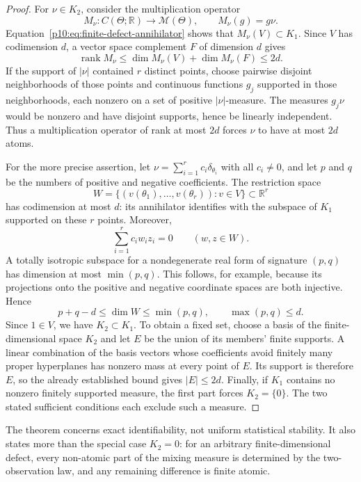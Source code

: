 \documentclass[11pt,letterpaper]{article}
\theoremstyle{definition}
\theoremstyle{remark}
\newcommand{\1}{\mathbf 1}
\begin{document}
\begin{proof}
For $\nu\in K_2$, consider the multiplication operator
\[
 M_\nu:C(\Theta;\mathbb R)\longrightarrow\mathcal M(\Theta),
 \qquad M_\nu(g)=g\nu.
\]
Equation~\eqref{p10:eq:finite-defect-annihilator} shows that
$M_\nu(V)\subset K_1$.  Since $V$ has codimension $d$, a vector space
complement $F$ of dimension $d$ gives
\[
 \operatorname{rank}M_\nu
 \leq \dim M_\nu(V)+\dim M_\nu(F)\leq 2d.
\]
If the support of $|\nu|$ contained $r$ distinct points, choose pairwise
disjoint neighborhoods of those points and continuous functions $g_j$
supported in those neighborhoods, each nonzero on a set of positive
$|\nu|$-measure.  The measures $g_j\nu$ would be nonzero and have disjoint
supports, hence be linearly independent.  Thus a multiplication operator of
rank at most $2d$ forces $\nu$ to have at most $2d$ atoms.

For the more precise assertion, let
$\nu=\sum_{i=1}^r c_i\delta_{\theta_i}$ with all $c_i\neq0$, and let $p$
and $q$ be the numbers of positive and negative coefficients.  The restriction
space
\[
 W=\{(v(\theta_1),\ldots,v(\theta_r)):v\in V\}\subset\mathbb R^r
\]
has codimension at most $d$: its annihilator identifies with the subspace of
$K_1$ supported on these $r$ points.  Moreover,
\[
 \sum_{i=1}^r c_i w_i z_i=0\qquad(w,z\in W).
\]
A totally isotropic subspace for a nondegenerate real form of signature
$(p,q)$ has dimension at most $\min(p,q)$.  This follows, for example,
because its projections onto the positive and negative coordinate spaces
are both injective.  Hence
\[
 p+q-d\leq\dim W\leq\min(p,q),
 \qquad \max(p,q)\leq d.
\]
Since $1\in V$, we have $K_2\subset K_1$.  To obtain a fixed set, choose a
basis of the finite-dimensional space $K_2$ and let $E$ be the union of its
members' finite supports.  A linear
combination of the basis vectors whose coefficients avoid finitely many
proper hyperplanes has nonzero mass at every point of $E$.  Its support is
therefore $E$, so the already established bound gives $|E|\leq2d$.
Finally, if $K_1$ contains no nonzero
finitely supported measure, the first part forces $K_2=\{0\}$.  The two
stated sufficient conditions each exclude such a measure.
\end{proof}

The theorem concerns exact identifiability, not uniform statistical stability.
It also states more than the special case $K_2=0$: for an arbitrary
finite-dimensional defect, every non-atomic part of the mixing measure is
determined by the two-observation law, and any remaining difference is finite
atomic.
\end{document}
